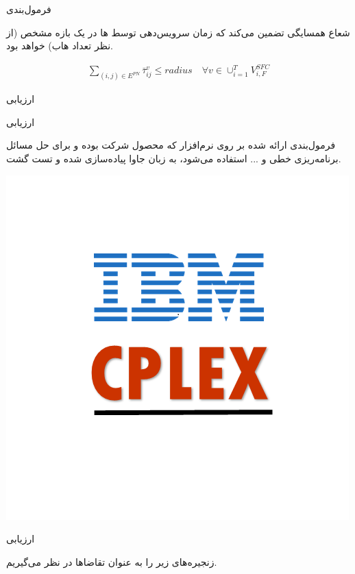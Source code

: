 \documentclass{beamer}
\begin{document}
\begin{persian}
\begin{frame}{فرمول‌بندی}
    \par
    شعاع همسایگی تضمین می‌کند که زمان سرویس‌دهی توسط
    ها
    در یک بازه مشخص (از نظر تعداد هاب)
    خواهد بود.
    \begin{latin}\begin{align}
        \sum_{(i, j) \in E^{PN}} \bar{\tau}_{ij}^{v} \le radius
        \quad
        \forall v \in \cup_{i=1}^T V_{i, F}^{SFC}
    \end{align}\end{latin}
\end{frame}
\begin{frame}{} %
    \begin{center}
        ارزیابی
    \end{center}
\end{frame}
\begin{frame}{ارزیابی} %
    \par
    فرمول‌بندی ارائه شده بر روی نرم‌افزار
    که محصول شرکت  بوده و برای حل مسائل برنامه‌ریزی خطی و ...
    استفاده می‌شود،
    به زبان جاوا پیاده‌سازی شده
    و تست گشت.

    \begin{center}
        \includegraphics[scale=0.4]{images/ibm-cplex.png}
    \end{center}
\end{frame}
\begin{frame}{ارزیابی} %
    \par
    زنجیره‌های زیر را به عنوان تقاضاها در نظر می‌گیریم.


\end{frame}
\end{persian}
\end{document}
